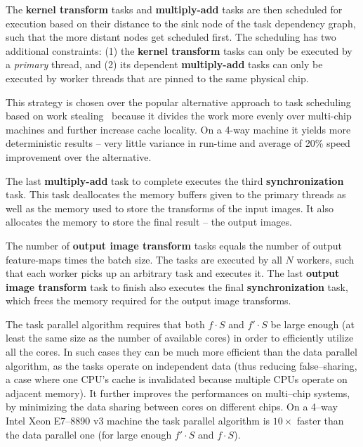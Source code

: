 \documentclass[conference]{./IEEEtran/IEEEtran}
\begin{document}
  The {\color{zblue}\bf kernel transform} tasks and {\color{zgreen}\bf
    multiply-add} tasks are then scheduled for execution based on
  their distance to the sink node of the task dependency graph, such
  that the more distant nodes get scheduled first.  The scheduling has
  two additional constraints: (1) the {\color{zblue}\bf kernel
    transform} tasks can only be executed by a \emph{primary} thread,
  and (2) its dependent {\color{zgreen}\bf multiply-add} tasks can
  only be executed by worker threads that are pinned to the same
  physical chip.

  This strategy is chosen over the popular alternative approach to
  task scheduling based on work stealing~\cite{reinders2007intel,
    willhalm2008putting} because it divides the work more evenly over
  multi-chip machines and further increase cache locality.  On a 4-way
  machine it yields more deterministic results -- very little variance
  in run-time and average of 20\% speed improvement over the
  alternative.

  The last {\color{zgreen}\bf multiply-add} task to complete executes
  the third {\color{zyellow}\bf synchronization} task.  This task
  deallocates the memory buffers given to the primary threads as well
  as the memory used to store the transforms of the input images.  It
  also allocates the memory to store the final result -- the output
  images.

  The number of {\color{zpurple}\bf output image transform} tasks
  equals the number of output feature-maps times the batch size.  The
  tasks are executed by all $N$ workers, such that each worker picks
  up an arbitrary task and executes it.  The last {\color{zpurple}\bf
    output image transform} task to finish also executes the final
  {\color{zyellow}\bf synchronization} task, which frees the memory
  required for the output image transforms.

  The task parallel algorithm requires that both $f \cdot S$ and $f'
  \cdot S$ be large enough (at least the same size as the number of
  available cores) in order to efficiently utilize all the cores.  In
  such cases they can be much more efficient than the data parallel
  algorithm, as the tasks operate on independent data (thus reducing
  false--sharing, a case where one CPU's cache is invalidated because
  multiple CPUs operate on adjacent memory).  It further improves the
  performances on multi--chip systems, by minimizing the data sharing
  between cores on different chips. On a 4--way Intel Xeon E7--8890 v3
  machine the task parallel algorithm is $10 \times$ faster than the
  data parallel one (for large enough $f' \cdot S$ and $f \cdot S$).
\end{document}
